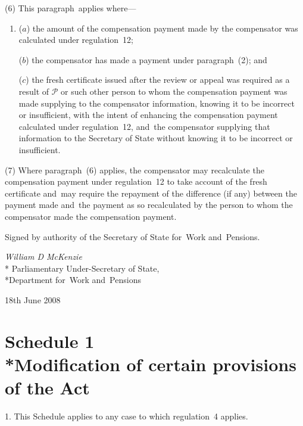 \documentclass[12pt,a4paper]{article}
\begin{document}
(6) This paragraph~applies where—
\begin{enumerate}\item[]
($a$) the amount of the compensation payment made by the compensator was calculated under regulation~12;

($b$) the compensator has made a payment under paragraph~(2); and

($c$) the fresh certificate issued after the review or appeal was required as a result of $\mathcal{P}$ or such other person to whom the compensation payment was made supplying to the compensator information, knowing it to be incorrect or insufficient, with the intent of enhancing the compensation payment calculated under regulation~12, and~the compensator supplying that information to the Secretary of State without knowing it to be incorrect or insufficient.
\end{enumerate}

(7) Where paragraph~(6) applies, the compensator may recalculate the compensation payment under regulation~12 to take account of the fresh certificate and~may require the repayment of the difference (if any) between the payment made and~the payment as so recalculated by the person to whom the compensator made the compensation payment. 

\bigskip

Signed 
by authority of the 
Secretary of State for~Work and~Pensions.

{\raggedleft
\emph{William D McKenzie}\\*
Parliamentary Under-Secretary 
of State,\\*Department 
for~Work and~Pensions

}

18th June 2008


\small

\part[Schedule 1 --- Modification of certain provisions of the Act]{Schedule 1\\*Modification of certain provisions of the Act}

\renewcommand\parthead{--- Schedule 1}

1.  This Schedule applies to any case to which regulation~4 applies.

\medskip
\end{document}
